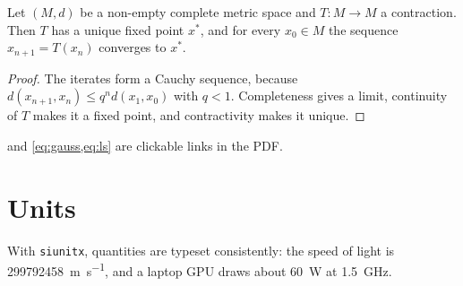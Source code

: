\begin{theorem}
  \label{thm:banach}
  Let $(M,d)$ be a non-empty complete metric space and $T\colon M\to M$ a
  contraction. Then $T$ has a unique fixed point $x^\ast$, and for every
  $x_0 \in M$ the sequence $x_{n+1} = T(x_n)$ converges to $x^\ast$.
\end{theorem}

\begin{proof}
  The iterates form a Cauchy sequence, because
  $d(x_{n+1},x_n) \le q^n d(x_1,x_0)$ with $q<1$. Completeness gives a limit,
  continuity of $T$ makes it a fixed point, and contractivity makes it unique.
\end{proof}

\begin{remark}
   and \cref{eq:gauss,eq:ls} are clickable links in the PDF.
\end{remark}

\section{Units}

With \texttt{siunitx}, quantities are typeset consistently: the speed of light
is \qty{299792458}{\metre\per\second}, and a laptop GPU draws about
\qty{60}{\watt} at \qty{1.5}{\giga\hertz}.
